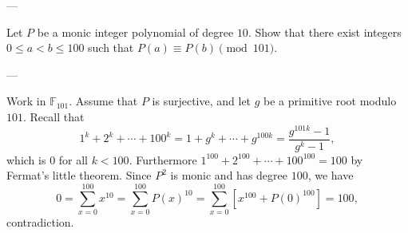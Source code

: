 
---

Let $P$ be a monic integer polynomial of degree $10$. Show that there exist integers $0\le a<b\le100$ such that $P(a)\equiv P(b)\pmod{101}$.

---

Work in $\mathbb F_{101}$. Assume that $P$ is surjective, and let $g$ be a primitive root modulo $101$. Recall that \[1^k+2^k+\cdots+100^k=1+g^k+\cdots+g^{100k}=\frac{g^{101k}-1}{g^k-1},\]
which is $0$ for all $k<100$. Furthermore $1^{100}+2^{100}+\cdots+100^{100}=100$ by Fermat's little theorem. Since $P^2$ is monic and has degree $100$, we have \[0=\sum_{x=0}^{100}x^{10}=\sum_{x=0}^{100}P(x)^{10}=\sum_{x=0}^{100}\left[x^{100}+P(0)^{100}\right]=100,\]
contradiction.

